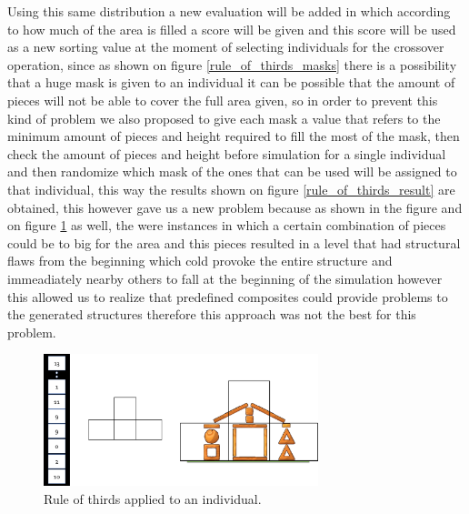 \documentclass[conference]{IEEEtran}
\begin{document}
    
    Using this same distribution a new evaluation will be added in which according
    to how much of the area is filled a score will be given and this score will be
    used as a new sorting value at the moment of selecting individuals for the
    crossover operation, since as shown on figure \ref{rule_of_thirds_masks} there
    is a possibility that a huge mask is given to an individual it can be possible
    that the amount of pieces will not be able to cover the full area given, so in
    order to prevent this kind of problem we also proposed to give each mask a
    value that refers to the minimum amount of pieces and height required to fill
    the most of the mask, then check the amount of pieces and height before
    simulation for a single individual and then randomize which mask of the ones
    that can be used will be assigned to that individual, this way the results shown
    on figure \ref{rule_of_thirds_result} are obtained, this however gave us a new
    problem because as shown in the figure and on figure \ref{rule_of_thirds_applied} as well, the were
    instances in which a certain combination of pieces could be to big for the area
    and this pieces resulted in a level that had structural flaws from the beginning
    which cold provoke the entire structure and immeadiately nearby others to fall
    at the beginning of the simulation however this allowed us to realize that predefined 
    composites could provide problems to the generated structures therefore this approach 
    was not the best for this problem.
    
    \begin{figure}[htbp]
        \centerline{\includegraphics[width=80mm]{Images/chromosome_thirds.png}}
        \caption{Rule of thirds applied to an individual.}
        \label{rule_of_thirds_applied}
    \end{figure}
    
\end{document}
